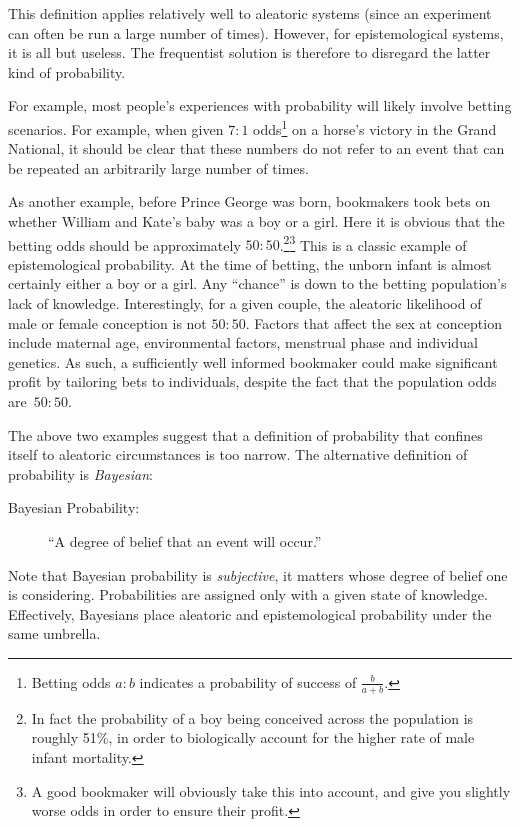 This definition applies relatively well to aleatoric systems (since an experiment can often be run a large number of times). However, for epistemological systems, it is all but useless. The frequentist solution is therefore to disregard the latter kind of probability.

For example, most people's experiences with probability will likely involve betting scenarios. For example, when given \(7:1\) odds\footnote{Betting odds \(a:b\) indicates a probability of success of \(\frac{b}{a+b}\).} on a horse's victory in the Grand National, it should be clear that these numbers do not refer to an event that can be repeated an arbitrarily large number of times.

As another example, before Prince George was born, bookmakers took bets on whether William and Kate's baby was a boy or a girl. Here it is obvious that the betting odds should be approximately \(50:50\).\footnote{In fact the probability of a boy being conceived across the population is roughly 51\%, in order to biologically account for the higher rate of male infant mortality.}\footnote{A good bookmaker will obviously take this into account, and give you slightly worse odds in order to ensure their profit.} This is a classic example of epistemological probability. At the time of betting, the unborn infant is almost certainly either a boy or a girl. Any ``chance'' is down to the betting population's lack of knowledge. Interestingly, for a given couple, the aleatoric likelihood of male or female conception is not \(50:50\). Factors that affect the sex at conception include maternal age, environmental factors, menstrual phase and individual genetics. As such, a sufficiently well informed bookmaker could make significant profit by tailoring bets to individuals, despite the fact that the population odds are~\(50:50\). 

The above two examples suggest that a definition of probability that confines itself to aleatoric circumstances is too narrow.
The alternative definition of probability is {\em Bayesian\/}:
\begin{description}
  \item[Bayesian Probability:] ``A degree of belief that an event will occur.'' 
\end{description}
Note that Bayesian probability is {\em subjective}, it matters whose degree of belief one is considering. Probabilities are assigned only with a given state of knowledge. Effectively, Bayesians place aleatoric and epistemological probability under the same umbrella. 

